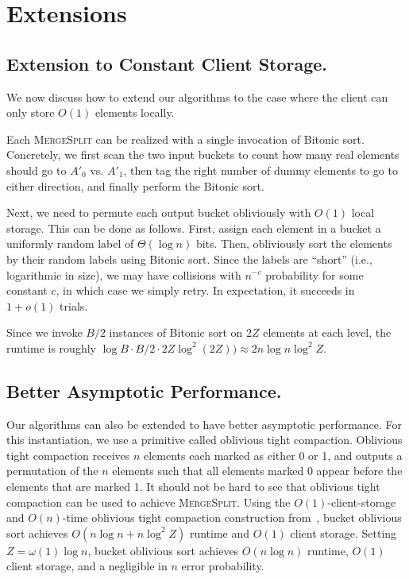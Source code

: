 
\section{Extensions}
\label{sec:extensions}

\subsection{Extension to Constant Client Storage.}
\label{sec:O1client}
We now discuss how to extend our algorithms to the case where the client can only store $O(1)$ elements locally.

Each \textsc{MergeSplit} can be realized with a single invocation of Bitonic sort.
Concretely, we first scan the two input buckets to count how many real elements should go to $A'_0$ vs. $A'_1$, then tag the right number of dummy elements to go to either direction, and finally perform the Bitonic sort.

Next, we need to permute each output bucket obliviously with $O(1)$ local storage. 
This can be done as follows. 
First, assign each element in a bucket a uniformly random label of $\Theta(\log n)$ bits. 
Then, obliviously sort the elements by their random labels using Bitonic sort. 
Since the labels are ``short'' (i.e., logarithmic in size), we may have collisions with $n^{-c}$ probability for some constant $c$, in which case we simply retry. 
In expectation, it succeeds in $1+o(1)$ trials. 


Since we invoke $B/2$ instances of Bitonic sort on $2Z$ elements at each level,
the runtime is roughly $\log B \cdot B/2 \cdot 2Z \log^2 (2Z)) \approx 2 n\log n \log^2 Z$. 

\subsection{Better Asymptotic Performance.}
Our algorithms can also be extended to have better asymptotic performance.
For this instantiation, we use a primitive called oblivious tight compaction.
Oblivious tight compaction receives $n$ elements each marked as either 0 or 1, and outputs a permutation of the $n$ elements such that all elements marked 0 appear before the elements that are marked 1. 
It should not be hard to see that oblivious tight compaction can be used to achieve \textsc{MergeSplit}.
Using the $O(1)$-client-storage and $O(n)$-time oblivious tight compaction construction from~\cite{asharov2018optorama}, bucket oblivious sort achieves $O(n\log n + n\log^2Z)$ runtime and $O(1)$ client storage.
Setting $Z=\omega(1)\log n$, bucket oblivious sort achieves $O(n\log n)$ runtime, $O(1)$ client storage, and a negligible in $n$ error probability.

